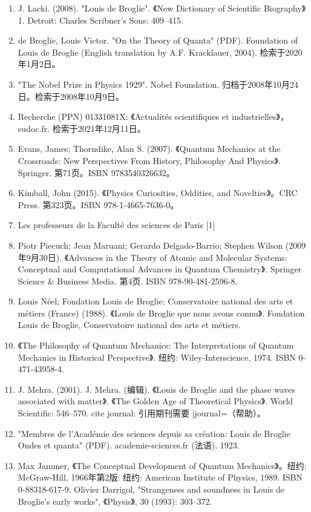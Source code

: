 \begin{enumerate}
\item J. Lacki. (2008). "Louis de Broglie". 《New Dictionary of Scientific Biography》 1. Detroit: Charles Scribner's Sons: 409–415.
\item de Broglie, Louis Victor. "On the Theory of Quanta" (PDF). Foundation of Louis de Broglie (English translation by A.F. Kracklauer, 2004). 检索于2020年1月2日。
\item "The Nobel Prize in Physics 1929". Nobel Foundation. 归档于2008年10月24日。检索于2008年10月9日。
\item Recherche (PPN) 01331081X: 《Actualités scientifiques et industrielles》，sudoc.fr. 检索于2021年12月11日。
\item Evans, James; Thorndike, Alan S. (2007). 《Quantum Mechanics at the Crossroads: New Perspectives From History, Philosophy And Physics》. Springer. 第71页。ISBN 9783540326632。
\item Kimball, John (2015). 《Physics Curiosities, Oddities, and Novelties》。CRC Press. 第323页。ISBN 978-1-4665-7636-0。
\item Les professeurs de la Faculté des sciences de Paris [1]
\item Piotr Piecuch; Jean Maruani; Gerardo Delgado-Barrio; Stephen Wilson (2009年9月30日). 《Advances in the Theory of Atomic and Molecular Systems: Conceptual and Computational Advances in Quantum Chemistry》. Springer Science & Business Media. 第4页. ISBN 978-90-481-2596-8.
\item Louis Néel; Fondation Louis de Broglie; Conservatoire national des arts et métiers (France) (1988). 《Louis de Broglie que nous avons connu》. Fondation Louis de Broglie, Conservatoire national des arts et métiers.
\item 《The Philosophy of Quantum Mechanics: The Interpretations of Quantum Mechanics in Historical Perspective》. 纽约: Wiley-Interscience, 1974. ISBN 0-471-43958-4.
\item J. Mehra. (2001). J. Mehra. (编辑). 《Louis de Broglie and the phase waves associated with matter》. 《The Golden Age of Theoretical Physics》. World Scientific: 546–570. {{cite journal}}: 引用期刊需要 |journal=（帮助）。
\item "Membres de l'Académie des sciences depuis sa création: Louis de Broglie Ondes et quanta" (PDF). academie-sciences.fr (法语). 1923.
\item Max Jammer, 《The Conceptual Development of Quantum Mechanics》。纽约: McGraw-Hill, 1966年第2版: 纽约: American Institute of Physics, 1989. ISBN 0-88318-617-9. Olivier Darrigol, "Strangeness and soundness in Louis de Broglie's early works", 《Physis》, 30 (1993): 303–372.

\end{enumerate}
